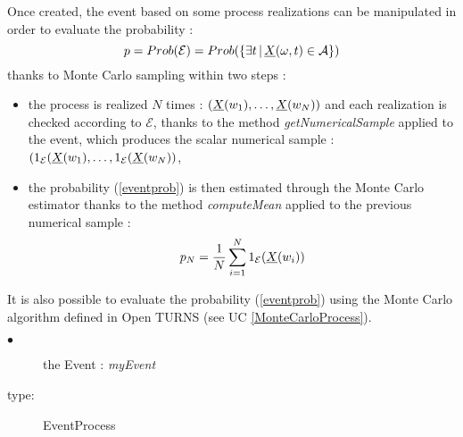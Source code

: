Once created, the event based on some process realizations can be manipulated in order to evaluate the probability :
\begin{equation}\label{eventprob}
p =  Prob(\mathcal{E}) = Prob(\{\exists t \, | \, {\underline{X}}(\omega,t)  \in \mathcal{A}\})
\end{equation}
 thanks to Monte Carlo sampling within two steps : 
\begin{itemize}
  \item the process is realized $N$ times  : $({\underline{X}}(w_1), \dots, {\underline{X}}(w_N))$ and each realization  is checked according to $\mathcal{E}$, thanks to the method {\itshape getNumericalSample} applied to the event, which produces the scalar numerical sample : $(1_{ \mathcal{E}}({\underline{X}}(w_1), \dots, 1_{ \mathcal{E}}({\underline{X}}(w_N)) $,
  \item the probability (\ref{eventprob})  is then estimated through the Monte Carlo estimator thanks to the method {\itshape computeMean} applied to the previous numerical sample :
\begin{equation}\label{pEstim}
p_N = \displaystyle \frac{1}{N} \sum_{i=1}^N 1_{ \mathcal{E}}({\underline{X}}(w_i))
\end{equation}
\end{itemize}


It is also possible to evaluate the probability (\ref{eventprob})  using the Monte Carlo algorithm defined in Open TURNS (see UC \ref{MonteCarloProcess}).\\


{
  \begin{description}
  \item[$\bullet$] the Event : {\itshape myEvent}
  \item[type:] EventProcess
  \end{description}

}

